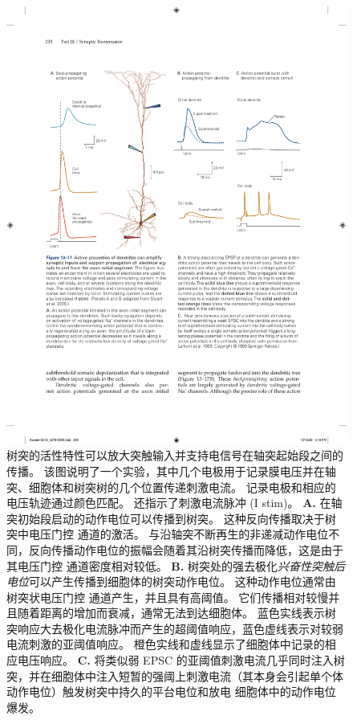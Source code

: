 \begin{figure}[htbp]
	\centering
	\includegraphics[width=0.95\linewidth]{chap13/fig_13_17}
	\caption{树突的活性特性可以放大突触输入并支持电信号在轴突起始段之间的传播。
		该图说明了一个实验，其中几个电极用于记录膜电压并在轴突、细胞体和树突树的几个位置传递刺激电流。
		记录电极和相应的电压轨迹通过颜色匹配。 还指示了刺激电流脉冲 (I stim)\cite{stuart2016dendrites}。
		\textbf{A.} 在轴突初始段启动的动作电位可以传播到树突。
		这种反向传播取决于树突中电压门控  通道的激活。
		与沿轴突不断再生的非递减动作电位不同，反向传播动作电位的振幅会随着其沿树突传播而降低，这是由于其电压门控  通道密度相对较低。
		\textbf{B.} 树突处的强去极化\textit{兴奋性突触后电位}可以产生传播到细胞体的树突动作电位。
		这种动作电位通常由树突状电压门控  通道产生，并且具有高阈值。
		它们传播相对较慢并且随着距离的增加而衰减，通常无法到达细胞体。
		蓝色实线表示树突响应大去极化电流脉冲而产生的超阈值响应，蓝色虚线表示对较弱电流刺激的亚阈值响应。
		橙色实线和虚线显示了细胞体中记录的相应电压响应。
		\textbf{C.} 将类似弱 EPSC 的亚阈值刺激电流几乎同时注入树突，并在细胞体中注入短暂的强阈上刺激电流（其本身会引起单个体动作电位）触发树突中持久的平台电位和放电 细胞体中的动作电位爆发\cite{larkum1999new}。}
	\label{fig:13_17}
\end{figure}


